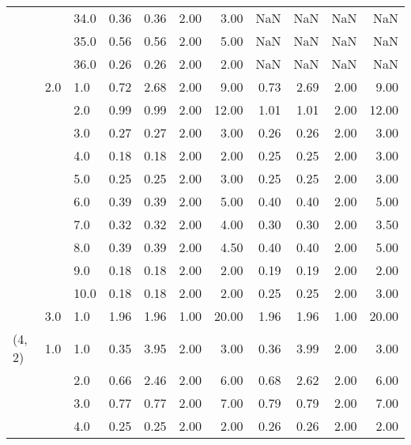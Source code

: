 \begin{tabular}{lllrrrrrrrr}
       &     & 34.0 &       0.36 &      0.36 & 2.00 &   3.00 &        NaN &       NaN &  NaN &    NaN \\
       &     & 35.0 &       0.56 &      0.56 & 2.00 &   5.00 &        NaN &       NaN &  NaN &    NaN \\
       &     & 36.0 &       0.26 &      0.26 & 2.00 &   2.00 &        NaN &       NaN &  NaN &    NaN \\
       & 2.0 & 1.0  &       0.72 &      2.68 & 2.00 &   9.00 &       0.73 &      2.69 & 2.00 &   9.00 \\
       &     & 2.0  &       0.99 &      0.99 & 2.00 &  12.00 &       1.01 &      1.01 & 2.00 &  12.00 \\
       &     & 3.0  &       0.27 &      0.27 & 2.00 &   3.00 &       0.26 &      0.26 & 2.00 &   3.00 \\
       &     & 4.0  &       0.18 &      0.18 & 2.00 &   2.00 &       0.25 &      0.25 & 2.00 &   3.00 \\
       &     & 5.0  &       0.25 &      0.25 & 2.00 &   3.00 &       0.25 &      0.25 & 2.00 &   3.00 \\
       &     & 6.0  &       0.39 &      0.39 & 2.00 &   5.00 &       0.40 &      0.40 & 2.00 &   5.00 \\
       &     & 7.0  &       0.32 &      0.32 & 2.00 &   4.00 &       0.30 &      0.30 & 2.00 &   3.50 \\
       &     & 8.0  &       0.39 &      0.39 & 2.00 &   4.50 &       0.40 &      0.40 & 2.00 &   5.00 \\
       &     & 9.0  &       0.18 &      0.18 & 2.00 &   2.00 &       0.19 &      0.19 & 2.00 &   2.00 \\
       &     & 10.0 &       0.18 &      0.18 & 2.00 &   2.00 &       0.25 &      0.25 & 2.00 &   3.00 \\
       & 3.0 & 1.0  &       1.96 &      1.96 & 1.00 &  20.00 &       1.96 &      1.96 & 1.00 &  20.00 \\
(4, 2) & 1.0 & 1.0  &       0.35 &      3.95 & 2.00 &   3.00 &       0.36 &      3.99 & 2.00 &   3.00 \\
       &     & 2.0  &       0.66 &      2.46 & 2.00 &   6.00 &       0.68 &      2.62 & 2.00 &   6.00 \\
       &     & 3.0  &       0.77 &      0.77 & 2.00 &   7.00 &       0.79 &      0.79 & 2.00 &   7.00 \\
       &     & 4.0  &       0.25 &      0.25 & 2.00 &   2.00 &       0.26 &      0.26 & 2.00 &   2.00 \\

\end{tabular}
